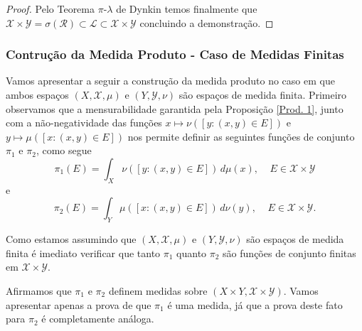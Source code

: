 \begin{proof}
Pelo Teorema $\pi$-$\lambda$ de Dynkin 
temos finalmente que $\mathscr{X}\times \mathscr{Y}= \sigma(\mathscr{R})\subset \mathscr{L}\subset \mathscr{X}\times \mathscr{Y}$ concluindo a demonstração.
\end{proof}


\bigskip


\subsubsection{Contrução da Medida Produto - Caso de Medidas Finitas}
Vamos apresentar a seguir a construção da medida produto no caso 
em que ambos espaços $(X,\mathscr{X},\mu)$ e $(Y,\mathscr{Y},\nu)$
são espaços de medida finita. 
Primeiro observamos que a mensurabilidade 
garantida pela Proposição \ref{Prod. 1},
junto com a não-negatividade das funções
$x\mapsto \nu([y:(x,y)\in E ])$ e $y\mapsto \mu([x:(x,y)\in E ])$
nos permite definir as seguintes 
funções de conjunto $\pi_1$ e $\pi_2$, como segue
\begin{equation}\label{M.Prod. 1}
\pi_1(E)=\int_X \nu([y:(x,y)\in E ])\, d\mu(x),~~~~~E \in \mathscr{X}\times \mathscr{Y}
\end{equation}
e 
\begin{equation}\label{M. Prod. 2}
\pi_2(E)=\int_Y \mu([x:(x,y)\in E ])\, d\nu(y),~~~~~E \in \mathscr{X}\times \mathscr{Y}.
\end{equation}

Como estamos assumindo que 
$(X,\mathscr{X},\mu)$ e $(Y,\mathscr{Y},\nu)$
são espaços de medida finita é imediato verificar 
que tanto $\pi_1$ quanto $\pi_2$ 
são funções de conjunto finitas em $\mathscr{X}\times \mathscr{Y}$.

Afirmamos que $\pi_1$ e $\pi_2$ definem medidas sobre 
$(X\times Y,\mathscr{X}\times\mathscr{Y})$. 
Vamos apresentar apenas a prova de que $\pi_1$ é uma medida,
já que a prova deste fato para $\pi_2$
é completamente análoga.


